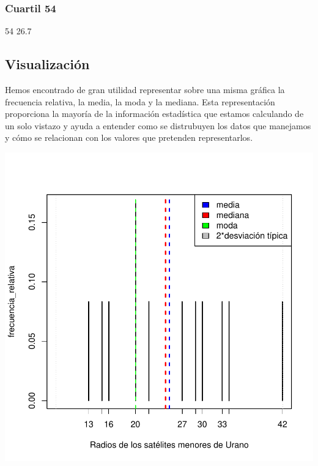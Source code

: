 \documentclass [a4paper] {article}
\begin{document}
\subsubsection{Cuartil 54}
\begin{Schunk}
\begin{Soutput}
 54%
26.7 
\end{Soutput}
\end{Schunk}

\subsection{Visualización}
Hemos encontrado de gran utilidad representar sobre una misma gráfica la frecuencia relativa, la media, la moda y la mediana.
Esta representación proporciona la mayoría de la información estadística que estamos calculando de un solo vistazo y ayuda a entender como se
distrubuyen los datos que manejamos y cómo se relacionan con los valores que pretenden representarlos.
\begin{center}
\includegraphics{entrega-estadisticos_satelites_plot}
\end{center}
\end{document}
